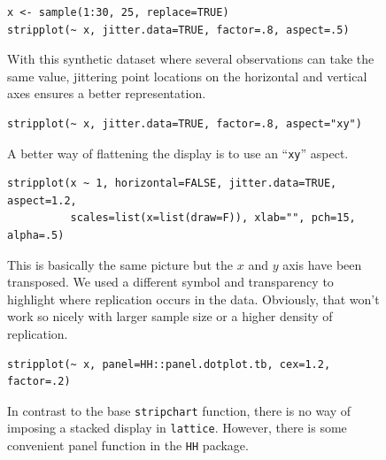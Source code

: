 \documentclass[a4paper,twoside]{book}
\newcounter{fig}
\newcommand{\img}[1]{\texttt{[image: \#1]}\stepcounter{fig}}
\renewcommand{\texttt}[1]{\lstinline{#1}}
\begin{document}
\begin{figure}[H]
\begin{lstlisting}
x <- sample(1:30, 25, replace=TRUE)
stripplot(~ x, jitter.data=TRUE, factor=.8, aspect=.5)
\end{lstlisting}
  \fcapside[\FBwidth] {\img{figs_lattice-crop}}
  {\caption*{With this synthetic dataset where several observations
      can take the same value, jittering point locations on the
      horizontal and vertical axes ensures a better representation.}}
\end{figure}

\begin{figure}[H]
\begin{lstlisting}
stripplot(~ x, jitter.data=TRUE, factor=.8, aspect="xy")
\end{lstlisting}
  \fcapside[\FBwidth] {\img{figs_lattice-crop}}
  {\caption*{A better way of flattening the display is to use an
      ``\texttt{xy}'' aspect.}}
\end{figure}

\begin{figure}[H]
\begin{lstlisting}
stripplot(x ~ 1, horizontal=FALSE, jitter.data=TRUE, aspect=1.2,
          scales=list(x=list(draw=F)), xlab="", pch=15, alpha=.5)
\end{lstlisting}
  \fcapside[\FBwidth] {\img{figs_lattice-crop}}
  {\caption*{This is basically the same picture but the $x$ and $y$
      axis have been transposed. We used a different symbol and
      transparency to highlight where replication occurs in the
      data. Obviously, that won't work so nicely with larger sample
      size or a higher density of replication.}}
\end{figure}

\begin{figure}[H]
\begin{lstlisting}
stripplot(~ x, panel=HH::panel.dotplot.tb, cex=1.2, factor=.2)
\end{lstlisting}
  \fcapside[\FBwidth] {\img{figs_lattice-crop}} {\caption*{In contrast
      to the base \texttt{stripchart} function, there is no way of
      imposing a stacked display in \texttt{lattice}. However, there
      is some convenient panel function in the \texttt{HH} package.}}
\end{figure}
\end{document}
